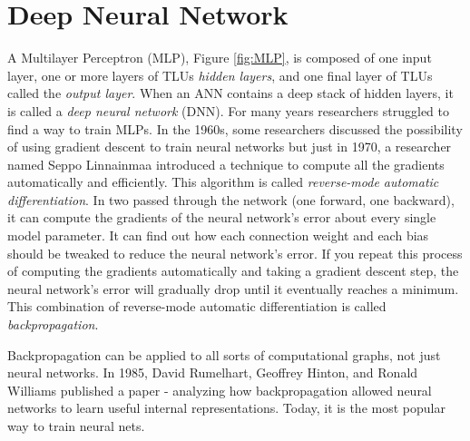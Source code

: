 \section{Deep Neural Network}
A Multilayer Perceptron (MLP), Figure \ref{fig:MLP}, is composed of one input layer, one or more layers of TLUs \textit{hidden layers}, and one final layer of TLUs called the \textit{output layer}.
When an ANN contains a deep stack of hidden layers, it is called a \textit{deep neural network} (DNN). 
For many years researchers struggled to find a way to train MLPs. In the 1960s, some researchers discussed the possibility of using gradient descent to train neural networks but just in 1970, a researcher named Seppo Linnainmaa introduced a technique to compute all the gradients automatically and efficiently. This algorithm is called \textit{reverse-mode automatic differentiation}. 
In two passed through the network (one forward, one backward), it can compute the gradients of the neural network's error about every single model parameter.
It can find out how each connection weight and each bias should be tweaked to reduce the neural network's error. 
If you repeat this process of computing the gradients automatically and taking a gradient descent step, the neural network's error will gradually drop until it eventually reaches a minimum. This combination of reverse-mode automatic differentiation is called \textit{backpropagation}.

Backpropagation can be applied to all sorts of computational graphs, not just neural networks. In 1985, David Rumelhart, Geoffrey Hinton, and Ronald Williams published a paper - analyzing how backpropagation allowed neural networks to learn useful internal representations. Today, it is the most popular way to train neural nets.













